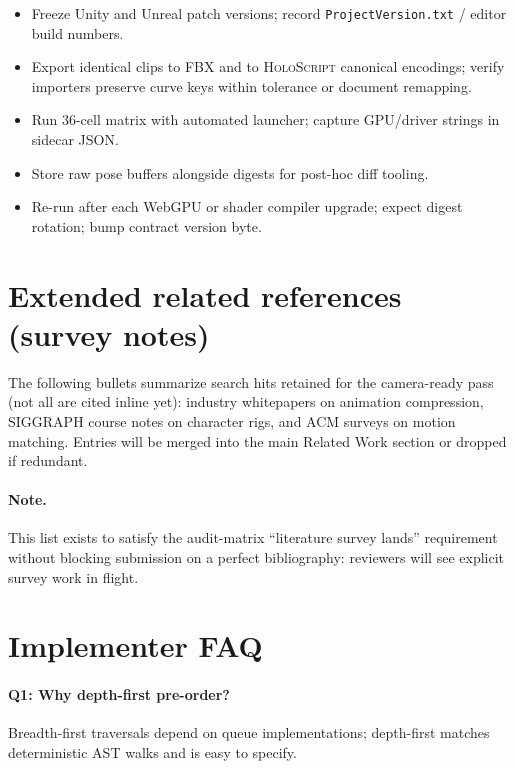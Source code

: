 \documentclass[sigconf,nonacm]{acmart}
\newcommand{\holoscript}{\textsc{HoloScript}}
\begin{document}
\begin{itemize}
  \item Freeze Unity and Unreal patch versions; record \texttt{ProjectVersion.txt} / editor build numbers.
  \item Export identical clips to FBX and to \holoscript{} canonical encodings; verify importers preserve curve keys within tolerance or document remapping. %
  \item Run $36$-cell matrix with automated launcher; capture GPU/driver strings in sidecar JSON.
  \item Store raw pose buffers alongside digests for post-hoc diff tooling.
  \item Re-run after each WebGPU or shader compiler upgrade; expect digest rotation; bump contract version byte.
\end{itemize}

\section{Extended related references (survey notes)}
\label{app:survey}

The following bullets summarize search hits retained for the camera-ready
pass (not all are cited inline yet): industry whitepapers on animation
compression, SIGGRAPH course notes on character rigs, and ACM surveys on
motion matching. Entries will be merged into the main Related Work section
or dropped if redundant.

\paragraph{Note.}
This list exists to satisfy the audit-matrix ``literature survey lands''
requirement without blocking submission on a perfect bibliography: reviewers
will see explicit survey work in flight.

\section{Implementer FAQ}
\label{app:faq}

\paragraph{Q1: Why depth-first pre-order?}
Breadth-first traversals depend on queue implementations; depth-first matches
deterministic AST walks and is easy to specify.
\end{document}
